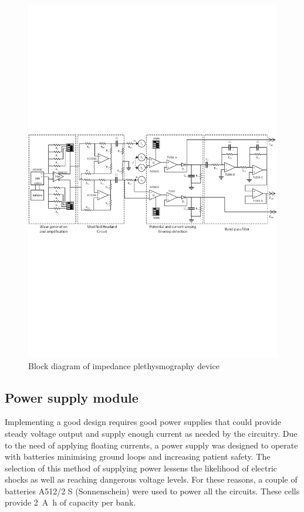 \begin{landscape}\centering
	\vspace*{\fill}
	\begin{figure}[!htp]
		\includegraphics[height=0.59\textheight,keepaspectratio]{figure2}
	    \caption{Block diagram of impedance plethysmography device}
	    \label{fig:block}
	\end{figure}
    \vspace*{\fill}
\end{landscape}

\subsection{Power supply module}
\label{section design battery}
Implementing a good design requires good power supplies that could provide steady voltage output and supply enough current as needed by the circuitry. Due to the need of applying floating currents, a power supply was designed to operate with batteries minimising ground loops and increasing patient safety.  The selection of this method of supplying power lessens the likelihood of electric shocks as well as reaching dangerous voltage levels. For these reasons, a couple of batteries A512/2 S (Sonnenschein) were used to power all the circuits. These cells provide \SI{2}{\ampere\hour} of capacity per bank.

